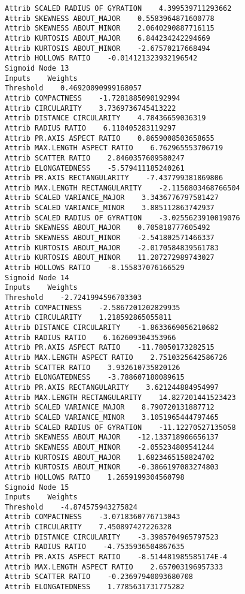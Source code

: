 \documentclass[
	article,			%
	11pt,				%
	oneside,			%
	a4paper,			%
	english,			%
	brazil,				%
	sumario=tradicional
	]{abntex2}
\begin{document}
\begin{lstlisting}
Attrib SCALED RADIUS OF GYRATION    4.399539711293662
Attrib SKEWNESS ABOUT_MAJOR    0.5583964871600778
Attrib SKEWNESS ABOUT_MINOR    2.0640290887716115
Attrib KURTOSIS ABOUT_MAJOR    6.844234242294669
Attrib KURTOSIS ABOUT_MINOR    -2.67570217668494
Attrib HOLLOWS RATIO    -0.014121323932196542
Sigmoid Node 13
Inputs    Weights
Threshold    0.46920090999168057
Attrib COMPACTNESS    -1.7281885090192994
Attrib CIRCULARITY    3.7369736745413222
Attrib DISTANCE CIRCULARITY    4.78436659036319
Attrib RADIUS RATIO    6.110405283119297
Attrib PR.AXIS ASPECT RATIO    0.8659008503658655
Attrib MAX.LENGTH ASPECT RATIO    6.762965553706719
Attrib SCATTER RATIO    2.8460357609580247
Attrib ELONGATEDNESS    -5.579411185240261
Attrib PR.AXIS RECTANGULARITY    -7.437799381869806
Attrib MAX.LENGTH RECTANGULARITY    -2.1150803468766504
Attrib SCALED VARIANCE_MAJOR    3.3436776797581427
Attrib SCALED VARIANCE_MINOR    3.885112863742937
Attrib SCALED RADIUS OF GYRATION    -3.0255623910019076
Attrib SKEWNESS ABOUT_MAJOR    0.705818777605492
Attrib SKEWNESS ABOUT_MINOR    -2.541802571466337
Attrib KURTOSIS ABOUT_MAJOR    -2.0170584839561783
Attrib KURTOSIS ABOUT_MINOR    11.207272989743027
Attrib HOLLOWS RATIO    -8.155837076166529
Sigmoid Node 14
Inputs    Weights
Threshold    -2.7241994596703303
Attrib COMPACTNESS    -2.5867201202829935
Attrib CIRCULARITY    1.218592865055811
Attrib DISTANCE CIRCULARITY    -1.8633669056210682
Attrib RADIUS RATIO    6.162609304353966
Attrib PR.AXIS ASPECT RATIO    -11.78050173282515
Attrib MAX.LENGTH ASPECT RATIO    2.7510325642586726
Attrib SCATTER RATIO    3.932610735820126
Attrib ELONGATEDNESS    -3.788607180089615
Attrib PR.AXIS RECTANGULARITY    3.621244884954997
Attrib MAX.LENGTH RECTANGULARITY    14.827201441523423
Attrib SCALED VARIANCE_MAJOR    8.790720131887712
Attrib SCALED VARIANCE_MINOR    3.1051965444797465
Attrib SCALED RADIUS OF GYRATION    -11.12270527135058
Attrib SKEWNESS ABOUT_MAJOR    -12.133718906656137
Attrib SKEWNESS ABOUT_MINOR    -2.055234809541244
Attrib KURTOSIS ABOUT_MAJOR    1.6823465158824702
Attrib KURTOSIS ABOUT_MINOR    -0.3866197083274803
Attrib HOLLOWS RATIO    1.2659199304560798
Sigmoid Node 15
Inputs    Weights
Threshold    -4.874575943275824
Attrib COMPACTNESS    -3.0718360776713043
Attrib CIRCULARITY    7.450897427226328
Attrib DISTANCE CIRCULARITY    -3.3985704965797523
Attrib RADIUS RATIO    -4.7535936504867635
Attrib PR.AXIS ASPECT RATIO    -8.514481985585174E-4
Attrib MAX.LENGTH ASPECT RATIO    2.657003196957333
Attrib SCATTER RATIO    -0.23697940093680708
Attrib ELONGATEDNESS    1.7785631731775282

\end{lstlisting}
\end{document}
